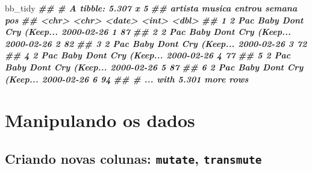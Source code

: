 \documentclass[
  11pt]{report}
\newenvironment{Shaded}{\begin{snugshade}}{\end{snugshade}}
\newcommand{\DocumentationTok}[1]{\textcolor[rgb]{0.56,0.35,0.01}{\textbf{\textit{#1}}}}
\newcommand{\NormalTok}[1]{#1}
\renewenvironment{Shaded}{
    \begin{mdframed}[%
      roundcorner=2pt,%
      innerleftmargin=5pt,%
      innerrightmargin=5pt,%
      topline=true,%
      leftline=true,%
      rightline=true,%
      bottomline=true,%
      linewidth=0.5pt,%
      linecolor=black!20,%
      backgroundcolor=black!2,%
      skipabove=2ex,%
      skipbelow=2.5ex%
    ]%
  }
  {
    \end{mdframed}
  }
\begin{document}
\begin{itemize}
\begin{Shaded}
\begin{Highlighting}[]
\NormalTok{bb\_tidy}
\DocumentationTok{\#\# \# A tibble: 5.307 x 5}
\DocumentationTok{\#\#   artista musica                  entrou     semana   pos}
\DocumentationTok{\#\#   \textless{}chr\textgreater{}   \textless{}chr\textgreater{}                   \textless{}date\textgreater{}      \textless{}int\textgreater{} \textless{}dbl\textgreater{}}
\DocumentationTok{\#\# 1 2 Pac   Baby Don\textquotesingle{}t Cry (Keep... 2000{-}02{-}26      1    87}
\DocumentationTok{\#\# 2 2 Pac   Baby Don\textquotesingle{}t Cry (Keep... 2000{-}02{-}26      2    82}
\DocumentationTok{\#\# 3 2 Pac   Baby Don\textquotesingle{}t Cry (Keep... 2000{-}02{-}26      3    72}
\DocumentationTok{\#\# 4 2 Pac   Baby Don\textquotesingle{}t Cry (Keep... 2000{-}02{-}26      4    77}
\DocumentationTok{\#\# 5 2 Pac   Baby Don\textquotesingle{}t Cry (Keep... 2000{-}02{-}26      5    87}
\DocumentationTok{\#\# 6 2 Pac   Baby Don\textquotesingle{}t Cry (Keep... 2000{-}02{-}26      6    94}
\DocumentationTok{\#\# \# ... with 5.301 more rows}
\end{Highlighting}
\end{Shaded}
\end{itemize}

\hypertarget{manipulando-os-dados}{%
\section{Manipulando os dados}\label{manipulando-os-dados}}

\hypertarget{criando-novas-colunas-mutate-transmute}{%
\subsection{\texorpdfstring{Criando novas colunas: \texttt{mutate}, \texttt{transmute}}{Criando novas colunas: mutate, transmute}}\label{criando-novas-colunas-mutate-transmute}}
\end{document}
